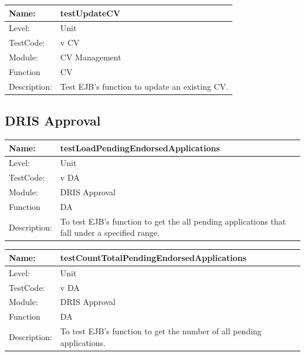 \documentclass[12pt]{article}
\begin{document}
\begin{center}
\begin{tabular}{|l|p{12cm}|}
\hline

 Name: & testUpdateCV  \\
\hline
Level: & Unit \\
\hline
TestCode: & v CV \\
\hline
Module:& CV Management \\
\hline
Function & CV \\
\hline
Description: & Test EJB's function to update an existing CV. \\
\hline
\end{tabular}
\end{center}


\subsection{DRIS Approval}

\begin{center}
\begin{tabular}{|l|p{12cm}|}
\hline
 Name: & testLoadPendingEndorsedApplications  \\
\hline
Level: & Unit \\
\hline
TestCode: & v DA \\
\hline
Module:& DRIS Approval \\
\hline
Function & DA \\
\hline
Description: & To test EJB's function to get the all pending applications that fall under a specified range. \\
\hline
\end{tabular}
\end{center}

\begin{center}
\begin{tabular}{|l|p{12cm}|}
\hline

 Name: & testCountTotalPendingEndorsedApplications  \\
\hline
Level: & Unit \\
\hline
TestCode: & v DA \\
\hline
Module:& DRIS Approval \\
\hline
Function & DA \\
\hline
Description: & To test EJB's function to get the number of all pending applications. \\
\hline
\end{tabular}
\end{center}
\end{document}
